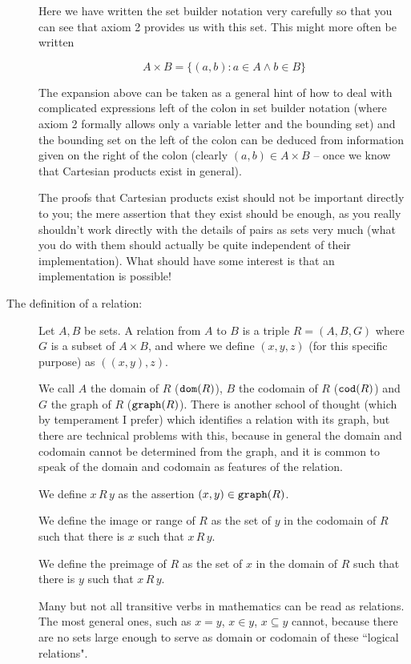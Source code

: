 \documentclass[12pt]{article}
\begin{document}
\begin{description}
Here we have written the set builder notation very carefully so that you can see that axiom 2 provides us with this set.  This might more often be written

$$A \times B = \{(a,b):a \in A \wedge b \in B\}$$

The expansion above can be taken as a general hint of how to deal with complicated expressions left of the colon in set builder notation (where axiom 2 formally allows
only a variable letter and the bounding set) and the bounding set on the left of the colon can be deduced from information given on the right of the colon (clearly $(a,b) \in A \times B$ -- once we know that Cartesian products exist in general).

The proofs that Cartesian products exist should not be important directly to you;  the mere assertion that they exist should be enough, as you really shouldn't work directly with the details of pairs as sets very much (what you do with them should actually be quite independent of their implementation).  What should have some interest is that an implementation is possible!

\item[The definition of a relation:]

Let $A,B$ be sets.  A relation from $A$ to $B$ is a triple $R=(A,B,G)$ where $G$ is a subset of $A \times B$, and where we define $(x,y,z)$ (for this specific purpose) as $((x,y),z)$.

We call $A$ the domain of $R$ (${\tt dom}(R)$), $B$ the codomain of $R$ (${\tt cod}(R)$) and $G$ the graph of $R$ (${\tt graph}(R)$).   There is another school of thought
(which by temperament I prefer) which identifies a relation with its graph, but there are technical problems with this, because in general the domain and codomain cannot be determined from the graph, and it is common to speak of the domain and codomain as features of the relation.

We define $x \,R\, y$ as the assertion $(x,y) \in {\tt graph}(R)$.

We define the image or range of $R$ as the set of $y$ in the codomain of $R$ such that there is $x$ such that $x \, R \, y$.

We define the preimage of $R$ as the set of $x$ in the domain of $R$ such that there is $y$ such that $x \, R \, y$.

Many but not all transitive verbs in mathematics can be read as relations.  The most general ones, such
as $x = y$, $x \in y$, $x \subseteq y$ cannot, because there are no sets large enough to serve as domain or codomain of these ``logical relations".


\end{description}
\end{document}
